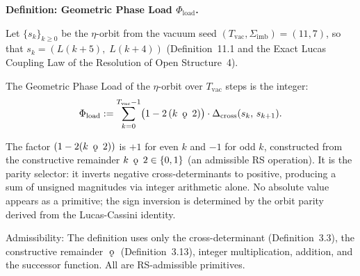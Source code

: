 \documentclass[11pt, letterpaper]{article}
\newcommand{\koppa}{\mathbin{\text{\rm\k{o}}}}
\theoremstyle{definition}
\theoremstyle{plain}
\begin{document}
\begin{rsbox}
\textbf{Definition: Geometric Phase Load $\Phi_\mathrm{load}$.}

Let $\{s_k\}_{k \geq 0}$ be the $\eta$-orbit from the vacuum seed $(T_\mathrm{vac},
\Sigma_\mathrm{imb}) = (11, 7)$, so that $s_k = (L(k+5),\; L(k+4))$ (Definition~11.1
and the Exact Lucas Coupling Law of the Resolution of Open Structure~4).

The Geometric Phase Load of the $\eta$-orbit over $T_\mathrm{vac}$
steps is the integer:
\begin{equation}
    \Phi_\mathrm{load} :=
    \sum_{k=0}^{T_\mathrm{vac}-1}
    \bigl(1 - 2\,(k \;\koppa\; 2)\bigr) \cdot \Delta_\mathrm{cross}(s_k,\, s_{k+1}).
    \label{eq:phiload_def}
\end{equation}

The factor $(1 - 2(k \;\koppa\; 2))$ is $+1$ for even $k$ and $-1$ for odd $k$,
constructed from the constructive remainder $k \;\koppa\; 2 \in \{0, 1\}$ (an
admissible RS operation). It is the parity selector: it inverts negative
cross-determinants to positive, producing a sum of unsigned magnitudes via integer
arithmetic alone. No absolute value appears as a primitive; the sign inversion is
determined by the orbit parity derived from the Lucas-Cassini identity.

Admissibility: The definition uses only the cross-determinant (Definition~3.3), the
constructive remainder $\;\koppa\;$ (Definition~3.13), integer multiplication, addition,
and the successor function. All are RS-admissible primitives.
\end{rsbox}
\end{document}
